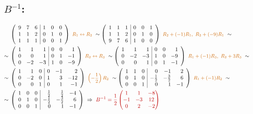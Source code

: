 \documentclass[10pt,a4paper]{article}
\newcommand{\pozn}[1]{{\color{red!75!black}#1}}
\newcommand{\aug}[1]{\left(\begin{array}{rrr|rrr}#1\end{array}\right)}
\newcommand{\krok}[1]{\text{\small\color{orange!80!black}#1}}
\begin{document}
\subsection*{\pozn{$B^{-1}$:}}
\begin{align*}
&\aug{9 & 7 & 6 & 1 & 0 & 0\\ 1 & 1 & 2 & 0 & 1 & 0\\ 1 & 1 & 1 & 0 & 0 & 1}
\ \krok{$R_1\leftrightarrow R_3$}\ \sim
\aug{1 & 1 & 1 & 0 & 0 & 1\\ 1 & 1 & 2 & 0 & 1 & 0\\ 9 & 7 & 6 & 1 & 0 & 0}
\ \krok{$R_2+(-1)R_1,\ R_3+(-9)R_1$}\ \sim\\
\sim{}&\aug{1 & 1 & 1 & 0 & 0 & 1\\ 0 & 0 & 1 & 0 & 1 & -1\\ 0 & -2 & -3 & 1 & 0 & -9}
\ \krok{$R_2\leftrightarrow R_3$}\ \sim
\aug{1 & 1 & 1 & 0 & 0 & 1\\ 0 & -2 & -3 & 1 & 0 & -9\\ 0 & 0 & 1 & 0 & 1 & -1}
\ \krok{$R_1+(-1)R_3,\ R_2+3R_3$}\ \sim\\
\sim{}&\aug{1 & 1 & 0 & 0 & -1 & 2\\ 0 & -2 & 0 & 1 & 3 & -12\\ 0 & 0 & 1 & 0 & 1 & -1}
\ \krok{$\left(-\frac12\right)R_2$}\ \sim
\aug{1 & 1 & 0 & 0 & -1 & 2\\ 0 & 1 & 0 & -\frac12 & -\frac32 & 6\\ 0 & 0 & 1 & 0 & 1 & -1}
\ \krok{$R_1+(-1)R_2$}\ \sim\\
\sim{}&\aug{1 & 0 & 0 & \frac12 & \frac12 & -4\\ 0 & 1 & 0 & -\frac12 & -\frac32 & 6\\ 0 & 0 & 1 & 0 & 1 & -1}
\ \Rightarrow\ \pozn{B^{-1}=\frac12\begin{pmatrix} 1 & 1 & -8\\ -1 & -3 & 12\\ 0 & 2 & -2 \end{pmatrix}}
\end{align*}
\end{document}
